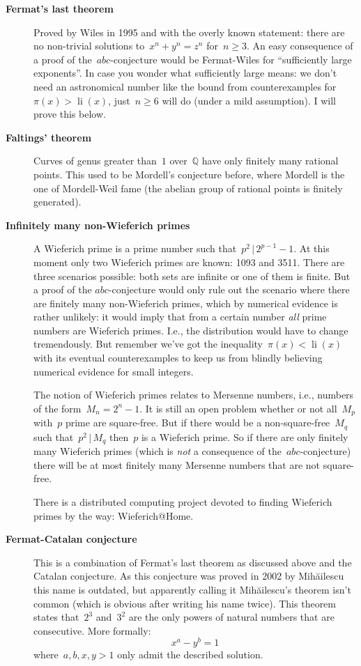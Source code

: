 \documentclass[11pt, a4paper, openany, oneside, article]{memoir}
\theoremstyle{definition}
\begin{document}
\begin{description}
  \item [\textbf{Fermat's last theorem}] Proved by Wiles in 1995 and with the overly known statement: there are no non-trivial solutions to~$x^n+y^n=z^n$ for~$n\geq 3$. An easy consequence of a proof of the~$abc$\nobreakdash-conjecture would be Fermat-Wiles for ``sufficiently large exponents''. In case you wonder what sufficiently large means: we don't need an astronomical number like the bound from counterexamples for~$\pi(x)>\operatorname{li}(x)$, just~$n\geq 6$ will do (under a mild assumption). I will prove this below.

  \item[\textbf{Faltings' theorem}] Curves of genus greater than~$1$ over~$\mathbb{Q}$ have only finitely many rational points. This used to be Mordell's conjecture before, where Mordell is the one of Mordell-Weil fame (the abelian group of rational points is finitely generated).

  \item[\textbf{Infinitely many non-Wieferich primes}] A Wieferich prime is a prime number such that~$p^2\,|\, 2^{p-1}-1$. At this moment only two Wieferich primes are known: 1093 and 3511. There are three scenarios possible: both sets are infinite or one of them is finite. But a proof of the $abc$\nobreakdash-conjecture would only rule out the scenario where there are finitely many non-Wieferich primes, which by numerical evidence is rather unlikely: it would imply that from a certain number \emph{all} prime numbers are Wieferich primes. I.e., the distribution would have to change tremendously. But remember we've got the inequality~$\pi(x)<\operatorname{li}(x)$ with its eventual counterexamples to keep us from blindly believing numerical evidence for small integers.

    The notion of Wieferich primes relates to Mersenne numbers, i.e., numbers of the form~$M_n=2^n-1$. It is still an open problem whether or not all~$M_p$ with~$p$ prime are square-free. But if there would be a non-square-free~$M_q$ such that~$p^2\,|\,M_q$ then~$p$ is a Wieferich prime. So if there are only finitely many Wieferich primes (which is \emph{not} a consequence of the~$abc$\nobreakdash-conjecture) there will be at most finitely many Mersenne numbers that are not square-free.

    There is a distributed computing project devoted to finding Wieferich primes by the way: Wieferich@Home.

  \item[\textbf{Fermat-Catalan conjecture}] This is a combination of Fermat's last theorem as discussed above and the Catalan conjecture. As this conjecture was proved in 2002 by Mih\u{a}ilescu this name is outdated, but apparently calling it Mih\u{a}ilescu's theorem isn't common (which is obvious after writing his name twice). This theorem states that~$2^3$ and~$3^2$ are the only powers of natural numbers that are consecutive. More formally:
    \begin{equation}
      x^a-y^b=1
    \end{equation}
    where~$a,b,x,y>1$ only admit the described solution.


\end{description}
\end{document}
